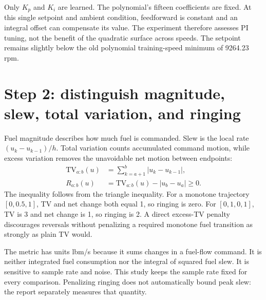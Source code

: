 Only $K_p$ and $K_i$ are learned. The polynomial's fifteen coefficients are fixed. At this single setpoint and ambient condition, feedforward is constant and an integral offset can compensate its value. The experiment therefore assesses PI tuning, not the benefit of the quadratic surface across speeds. The setpoint remains slightly below the old polynomial training-speed minimum of 9264.23 rpm.

\section{Step 2: distinguish magnitude, slew, total variation, and ringing}
Fuel magnitude describes how much fuel is commanded. Slew is the local rate $(u_k-u_{k-1})/h$. Total variation counts accumulated command motion, while excess variation removes the unavoidable net motion between endpoints:
\begin{align}
\mathrm{TV}_{a:b}(u)&=\sum_{k=a+1}^{b}|u_k-u_{k-1}|,\\
R_{a:b}(u)&=\mathrm{TV}_{a:b}(u)-|u_b-u_a|\ge0.
\end{align}
The inequality follows from the triangle inequality. For a monotone trajectory $[0,0.5,1]$, TV and net change both equal 1, so ringing is zero. For $[0,1,0,1]$, TV is 3 and net change is 1, so ringing is 2. A direct excess-TV penalty discourages reversals without penalizing a required monotone fuel transition as strongly as plain TV would.

The metric has units lbm/s because it sums changes in a fuel-flow command. It is neither integrated fuel consumption nor the integral of squared fuel slew. It is sensitive to sample rate and noise. This study keeps the sample rate fixed for every comparison. Penalizing ringing does not automatically bound peak slew: the report separately measures that quantity.

